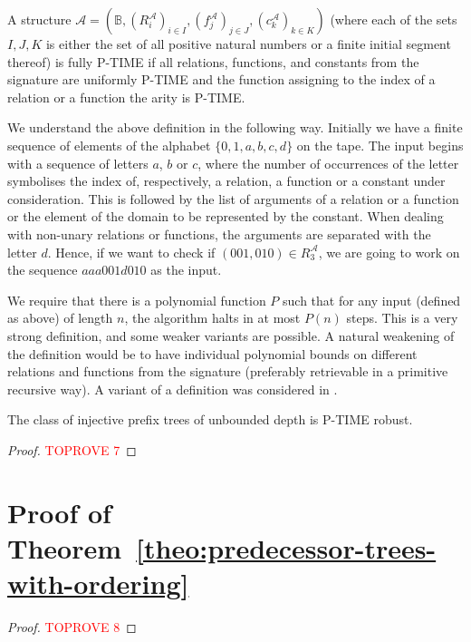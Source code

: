 \documentclass[a4paper,UKenglish,cleveref, autoref, thm-restate]{lipics-v2021}
\begin{document}
\begin{definition}
    A structure $\mathcal{A}=(\mathbb{B},(R_i^{\mathcal{A}})_{i \in I},(f_j^{\mathcal{A}})_{j \in J},(c_k^{\mathcal{A}})_{k \in K})$ (where each of the sets $I,J,K$ is either the set of all positive natural numbers or a finite initial segment thereof) is fully P-TIME if all relations, functions, and constants from the signature are uniformly P-TIME and the function assigning to the index of a relation or a function the arity is P-TIME.
\end{definition}

We understand the above definition in the following way. Initially we have a finite sequence of elements of the alphabet $\{0,1,a,b,c,d\}$ on the tape. The input begins with a sequence of letters $a$, $b$ or $c$, where the number of occurrences of the letter symbolises the index of, respectively, a relation, a function or a constant under consideration. This is followed by the list of arguments of a relation or a function or the element of the domain to be represented by the constant. When dealing with non-unary relations or functions, the arguments are separated with the letter $d$. Hence, if we want to check if $(001,010) \in R_3^{\mathcal{A}}$, we are going to work on the sequence $aaa001d010$ as the input.

We require that there is a polynomial function $P$ such that for any input (defined as above) of length $n$, the algorithm halts in at most $P(n)$ steps. This is a very strong definition, and some weaker variants are possible. A natural weakening of the definition would be to have individual polynomial bounds on different relations and functions from the signature (preferably retrievable in a primitive recursive way). A variant of a definition was considered in \cite{cenzer_feasibly}.

\begin{theorem}
    The class of injective prefix trees of unbounded depth is P-TIME robust.
\end{theorem}

\begin{proof}\textcolor{red}{TOPROVE 7}\end{proof}


\section{Proof of Theorem~\ref{theo:predecessor-trees-with-ordering}}\label{appendix:RPO-trees}

\theoRPOtrees*

\begin{proof}\textcolor{red}{TOPROVE 8}\end{proof}
    
\end{document}
